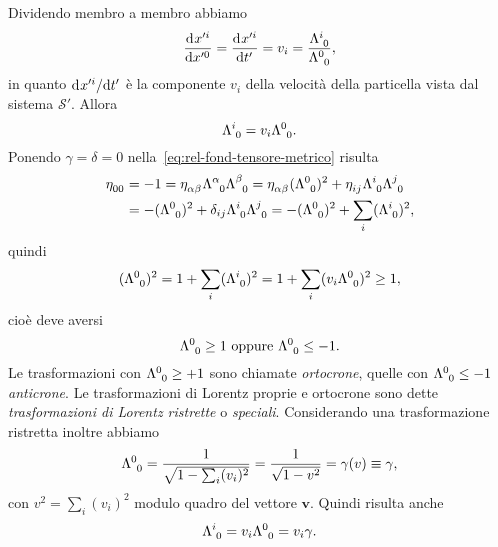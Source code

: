 Dividendo membro a membro abbiamo
\begin{equation}
  \toder{x'^{i}}{x'^{0}} = \toder{x'^{i}}{t'} = v_{i} =
  \frac{\tensor{\Lambda}{^{i}_{0}}}{\tensor{\Lambda}{^{0}_{0}}},
\end{equation}
in quanto $\mathrm{d}^{}x'^{i} / \mathrm{d} {t'}^{}$ è la componente $v_{i}$ della velocità della
particella vista dal sistema $\mathcal{S}'$.  Allora
\begin{equation}
  \tensor{\Lambda}{^{i}_{0}} = v_{i}\tensor{\Lambda}{^{0}_{0}}.
\end{equation}
Ponendo $\gamma = \delta = 0$ nella~\eqref{eq:rel-fond-tensore-metrico} risulta
\begin{equation}
  \begin{split}
    \tensor{\eta}{_{00}} &= -1 = \tensor{\eta}{_{\alpha\beta}}
    \tensor{\Lambda}{^{\alpha}_{0}} \tensor{\Lambda}{^{\beta}_{0}} =
    \tensor{\eta}{_{\alpha\beta}}(\tensor{\Lambda}{^{0}_{0}})^{2} +
    \tensor{\eta}{_{ij}} \tensor{\Lambda}{^{i}_{0}} \tensor{\Lambda}{^{j}_{0}}
    \\
    &= -(\tensor{\Lambda}{^{0}_{0}})^{2} + \delta_{ij}
    \tensor{\Lambda}{^{i}_{0}} \tensor{\Lambda}{^{j}_{0}} =
    -(\tensor{\Lambda}{^{0}_{0}})^{2}+\sum_{i}(\tensor{\Lambda}{^{i}_{0}})^{2},
  \end{split}
\end{equation}
quindi
\begin{equation}
  (\tensor{\Lambda}{^{0}_{0}})^{2} = 1 +
  \sum_{i}(\tensor{\Lambda}{^{i}_{0}})^{2} = 1 +
  \sum_{i}(v_{i}\tensor{\Lambda}{^{0}_{0}})^{2} \geq 1,
\end{equation}
cioè deve aversi
\begin{equation}
  \tensor{\Lambda}{^{0}_{0}} \geq 1 \text{ oppure } \tensor{\Lambda}{^{0}_{0}}
  \leq -1.
\end{equation}
Le trasformazioni con $\tensor{\Lambda}{^{0}_{0}} \geq +1$ sono chiamate
\emph{ortocrone}, quelle con $\tensor{\Lambda}{^{0}_{0}} \leq -1$
\emph{anticrone}.  Le trasformazioni di Lorentz proprie e ortocrone sono dette
\emph{trasformazioni di Lorentz ristrette} o \emph{speciali}.  Considerando una
trasformazione ristretta inoltre abbiamo
\begin{equation}
  \tensor{\Lambda}{^{0}_{0}} = \frac{1}{\sqrt{1-\sum_{i}(v_{i})^{2}}} =
  \frac{1}{\sqrt{1-v^{2}}} = \gamma(v) \equiv \gamma,
\end{equation}
con $v^{2} = \sum_{i}(v_{i})^{2}$ modulo quadro del vettore $\bm{v}$.  Quindi
risulta anche
\begin{equation}
  \tensor{\Lambda}{^{i}_{0}} = v_{i}\tensor{\Lambda}{^{0}_{0}} = v_{i}\gamma.
\end{equation}
